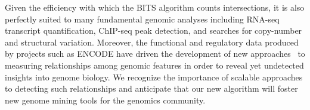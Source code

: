 \documentclass{bioinfo}
\begin{document}
Given the efficiency with which the BITS algorithm counts intersections,
it is also perfectly suited to many fundamental genomic analyses
including RNA-seq transcript quantification, ChIP-seq peak detection, and 
searches for copy-number and structural variation. Moreover, the 
functional and regulatory data produced by projects such as ENCODE
have driven the development of new approaches~\citep{favorov2012} 
to measuring relationships among genomic features in order to reveal yet 
undetected insights into genome biology. We recognize the importance of 
scalable approaches to detecting such relationships and anticipate that 
our new algorithm will foster new genome mining tools for the 
genomics community.



        
        
\end{document}
